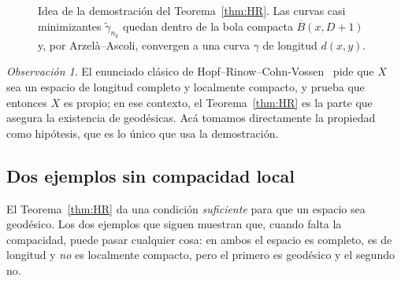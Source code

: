 \documentclass[12pt, a4paper]{amsart}
\theoremstyle{definition}
\theoremstyle{remark}
\newtheorem{observacion}[teorema]{Observación}
\newcommand{\Bc}{\overline{B}}
\begin{document}
\begin{figure}[htbp]
\centering
{}
\caption{Idea de la demostración del Teorema~\ref{thm:HR}. Las curvas casi minimizantes $\tilde\gamma_{n_k}$ quedan dentro de la bola compacta $\Bc(x,D+1)$ y, por Arzelà--Ascoli, convergen a una curva $\gamma$ de longitud $d(x,y)$.}
\label{fig:HR}
\end{figure}

\begin{observacion}
El enunciado clásico de Hopf--Rinow--Cohn-Vossen~\cite{HR,CV} pide que $X$ sea un espacio de longitud completo y localmente compacto, y prueba que entonces $X$ es propio; en ese contexto, el Teorema~\ref{thm:HR} es la parte que asegura la existencia de geodésicas. Acá tomamos directamente la propiedad como hipótesis, que es lo único que usa la demostración.
\end{observacion}

\subsection{Dos ejemplos sin compacidad local}\label{sec:ejemplos}

El Teorema~\ref{thm:HR} da una condición \emph{suficiente} para que un espacio sea geodésico. Los dos ejemplos que siguen muestran que, cuando falta la compacidad, puede pasar cualquier cosa: en ambos el espacio es completo, es de longitud y \emph{no} es localmente compacto, pero el primero es geodésico y el segundo no.
\end{document}
